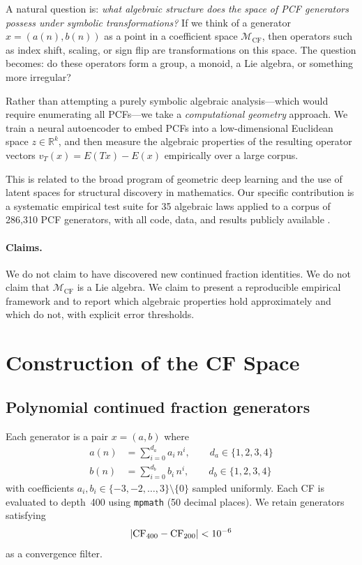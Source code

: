 \documentclass[11pt,a4paper]{article}
\begin{document}
A natural question is: \emph{what algebraic structure does the space of PCF
generators possess under symbolic transformations?}  If we think of a
generator $x = (a(n), b(n))$ as a point in a coefficient space
$\mathcal{M}_{\mathrm{CF}}$, then operators such as index shift, scaling, or
sign flip are transformations on this space.  The question becomes: do these
operators form a group, a monoid, a Lie algebra, or something more irregular?

Rather than attempting a purely symbolic algebraic analysis---which would
require enumerating all PCFs---we take a \emph{computational geometry}
approach.  We train a neural autoencoder to embed PCFs into a low-dimensional
Euclidean space $z \in \mathbb{R}^k$, and then measure the algebraic
properties of the resulting operator vectors $v_T(x) = E(Tx) - E(x)$
empirically over a large corpus.

This is related to the broad program of geometric deep learning
\cite{vaswani2017} and the use of latent spaces for structural discovery in
mathematics.  Our specific contribution is a systematic empirical test suite
for 35 algebraic laws applied to a corpus of 286{,}310 PCF generators, with
all code, data, and results publicly available \cite{cfspace2026github}.

\paragraph{Claims.}
We do not claim to have discovered new continued fraction identities.
We do not claim that $\mathcal{M}_{\mathrm{CF}}$ is a Lie algebra.
We claim to present a reproducible empirical framework and to report which
algebraic properties hold approximately and which do not, with explicit error
thresholds.

\section{Construction of the CF Space}
\label{sec:dataset}

\subsection{Polynomial continued fraction generators}

Each generator is a pair $x = (a, b)$ where
\begin{align}
  a(n) &= \sum_{i=0}^{d_a} a_i\, n^i, \qquad d_a \in \{1,2,3,4\}\\
  b(n) &= \sum_{i=0}^{d_b} b_i\, n^i, \qquad d_b \in \{1,2,3,4\}
\end{align}
with coefficients $a_i, b_i \in \{-3, -2, \ldots, 3\} \setminus \{0\}$
sampled uniformly.  Each CF is evaluated to depth~400 using \texttt{mpmath}
(50 decimal places).  We retain generators satisfying
\[
  |{\rm CF}_{400} - {\rm CF}_{200}| < 10^{-6}
\]
as a convergence filter.
\end{document}
